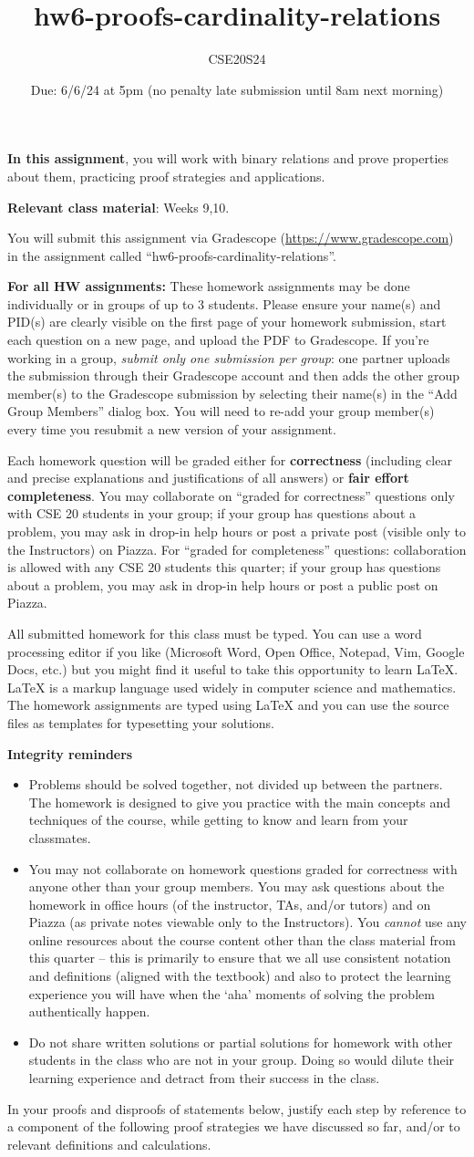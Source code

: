 \documentclass[12pt, oneside]{article}
\author{CSE20S24}
\title{hw6-proofs-cardinality-relations}
\date{Due: 6/6/24 at 5pm (no penalty late submission until 8am next morning)}
\newcommand{\instructions}{{\bf For all HW assignments:} 
These homework assignments may be done individually or in groups of up to 3 students.
Please ensure your name(s) and PID(s)
are clearly visible on the first page of your homework
submission, start each question on a new page, and upload the PDF to Gradescope.
If you're working in a group, {\it submit only one submission per group}: one partner uploads the
submission through their Gradescope account and then adds the other group member(s) to the Gradescope submission
by selecting their name(s) in the ``Add Group Members'' dialog box. You will need to re-add your group member(s)
every time you resubmit a new version of your assignment.

Each homework question will be graded either for
{\bf correctness} (including clear and precise explanations and justifications of all answers) or
{\bf fair effort completeness}. You may collaborate on ``graded for correctness''
questions only with CSE 20 students in your group; if your
 group has questions about a problem, you may ask in drop-in help hours or post a private
post (visible only to the Instructors) on Piazza.  
 For ``graded for completeness''
 questions: collaboration is allowed with any CSE 20 students this quarter; 
 if your group has questions about a problem, you may ask in drop-in 
 help hours or post a public post on Piazza.

All submitted homework for this class must be typed. 
You can use a word processing editor if you like (Microsoft Word, Open Office, Notepad, Vim, Google Docs, etc.) 
but you might find it useful to take this opportunity to learn LaTeX. 
LaTeX is a markup language used widely in computer science and mathematics. 
The homework assignments are typed using LaTeX and you can use the source files 
as templates for typesetting your solutions.

{\bf Integrity reminders}
\begin{itemize}
\item Problems should be solved together, not divided up between the partners. The homework is
designed to give you practice with the main concepts and techniques of the course, 
while getting to know and learn from your classmates.
\item You may not collaborate on homework questions graded for correctness with anyone other than your group members.
You may ask questions about the homework in office hours (of the instructor, TAs, and/or tutors) and 
on Piazza (as private notes viewable only to the Instructors).  
You \emph{cannot} use any online resources about the course content other than the class material 
from this quarter -- this is primarily to ensure that we all use consistent notation and
definitions (aligned with the textbook) and also to protect the learning experience you will have when
the `aha' moments of solving the problem authentically happen.
\item Do not share written solutions or partial solutions for homework with 
other students in the class who are not in your group. Doing so would dilute their learning 
experience and detract from their success in the class.
\end{itemize}

}
\begin{document}
\maketitle
\thispagestyle{fancy}

{\bf In this assignment}, you will work with binary relations and prove 
properties about them, practicing proof strategies and applications.

{\bf Relevant class material}: Weeks 9,10.

You will submit this assignment via Gradescope
(\href{https://www.gradescope.com}{https://www.gradescope.com}) 
in the assignment called ``hw6-proofs-cardinality-relations''.

\instructions

In your proofs and disproofs of statements below, justify each  step
by reference to  a component of the  following proof  strategies
we  have discussed so far, and/or to relevant definitions and calculations.

\vspace{-10pt}
\end{document}

